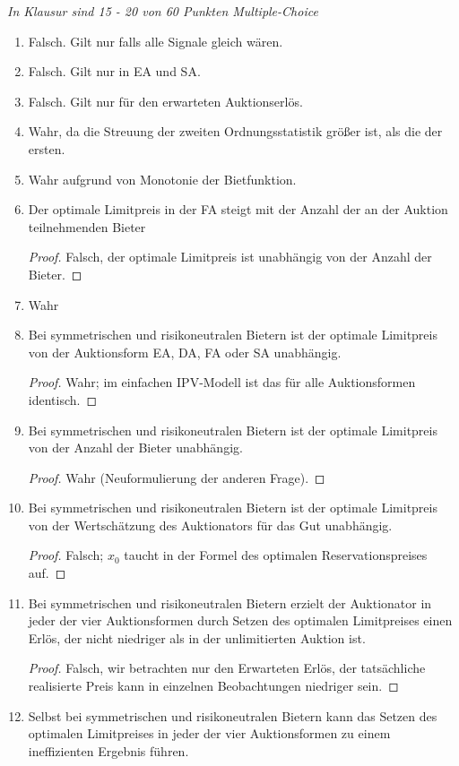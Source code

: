 \documentclass[12pt]{extreport} %
\theoremstyle{named}
\theoremstyle{nnamed}
\theoremstyle{itshape}
\theoremstyle{normal}
\begin{document}
\textit{In Klausur sind 15 - 20 von 60 Punkten Multiple-Choice}

\begin{enumerate} 
	\item Falsch. Gilt nur falls alle Signale gleich wären.
	\item Falsch. Gilt nur in EA und SA.
	\item Falsch. Gilt nur für den erwarteten Auktionserlös.
	\item Wahr, da die Streuung der zweiten Ordnungsstatistik größer ist, als die der ersten.
	\item Wahr aufgrund von Monotonie der Bietfunktion.
	\item Der optimale Limitpreis in der FA steigt mit der Anzahl der an der Auktion teilnehmenden Bieter 
		\begin{proof}
			Falsch, der optimale Limitpreis ist unabhängig von der Anzahl der Bieter.	
		\end{proof} 
	\item Wahr
	\item Bei symmetrischen und risikoneutralen Bietern ist der optimale Limitpreis von der Auktionsform EA, DA, FA oder SA unabhängig.
		\begin{proof}
			Wahr; im einfachen IPV-Modell ist das für alle Auktionsformen identisch.
		\end{proof}
	\item Bei symmetrischen und risikoneutralen Bietern ist der optimale Limitpreis von der Anzahl der Bieter unabhängig.
		\begin{proof}
			Wahr (Neuformulierung der anderen Frage).
		\end{proof}
	\item Bei symmetrischen und risikoneutralen Bietern ist der optimale Limitpreis von der Wertschätzung des Auktionators für das Gut unabhängig.
		\begin{proof}
			Falsch; $x_{0}$ taucht in der Formel des optimalen Reservationspreises auf.
		\end{proof}
	\item Bei symmetrischen und risikoneutralen Bietern erzielt der Auktionator in jeder der vier Auktionsformen durch Setzen des optimalen Limitpreises einen Erlös, der nicht niedriger als in der unlimitierten Auktion ist.
		\begin{proof}
			Falsch, wir betrachten nur den Erwarteten Erlös, der tatsächliche realisierte Preis kann in einzelnen Beobachtungen niedriger sein.
		\end{proof}
	\item Selbst bei symmetrischen und risikoneutralen Bietern kann das Setzen des optimalen Limitpreises in jeder der vier Auktionsformen zu einem ineffizienten Ergebnis führen.

\end{enumerate}
\end{document}
